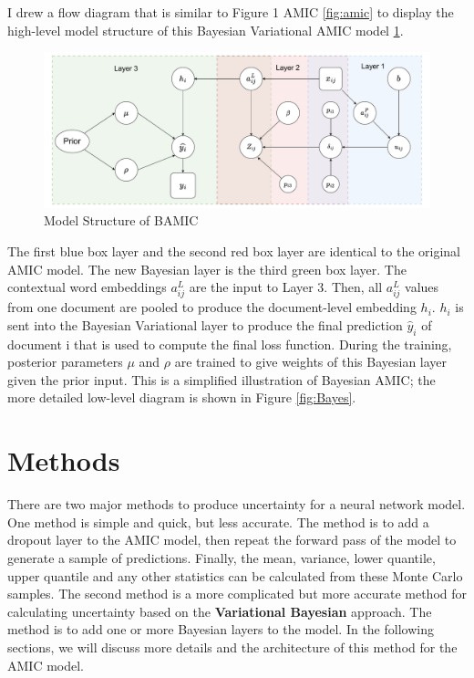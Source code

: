 \documentclass{article}
\begin{document}
I drew a flow diagram that is similar to Figure 1 AMIC \ref{fig:amic} to display the high-level model structure of this Bayesian Variational AMIC model \ref{fig:bamic}.
\begin{figure}[!ht]
    \centering
    \includegraphics[width=1\linewidth]{BAMIC.pdf}
    \caption{Model Structure of BAMIC}
    \label{fig:bamic}
\end{figure}
The first blue box layer and the second red box layer are identical to the original AMIC model. The new Bayesian layer is the third green box layer. The contextual word embeddings $a_{ij}^L$ are the input to Layer 3. Then, all $a_{ij}^L$ values from one document are pooled to produce the document-level embedding $h_i$. $h_i$ is sent into the Bayesian Variational layer to produce the final prediction $\hat{y}_i$ of document i that is used to compute the final loss function. During the training, posterior parameters $\mu$ and $\rho$ are trained to give weights of this Bayesian layer given the prior input. This is a simplified illustration of Bayesian AMIC; the more detailed low-level diagram is shown in Figure \ref{fig:Bayes}.    


\section{Methods}
There are two major methods to produce uncertainty for a neural network model. One method is simple and quick, but less accurate. The method is to add a dropout layer to the AMIC model, then repeat the forward pass of the model to generate a sample of predictions. Finally, the mean, variance, lower quantile, upper quantile and any other statistics can be calculated from these Monte Carlo samples. The second method is a more complicated but more accurate method for calculating uncertainty based on the \textbf{Variational Bayesian} approach. The method is to add one or more Bayesian layers to the model. In the following sections, we will discuss more details and the architecture of this method for the AMIC model. 
\end{document}
